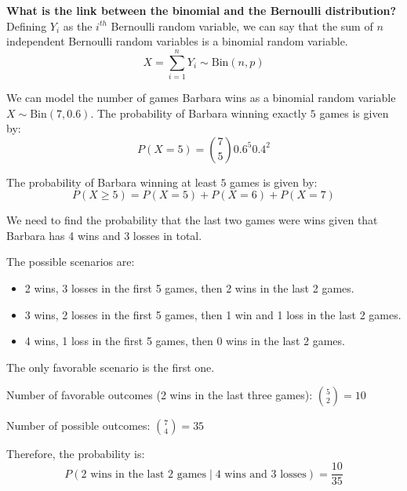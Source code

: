 \noindent\textbf{What is the link between the binomial and the Bernoulli distribution?}\\
Defining $Y_i$ as the $i^{th}$ Bernoulli random variable, we can say that the sum of $n$ independent Bernoulli random variables is a binomial random variable.
\begin{equation}
    X = \sum_{i=1}^{n} Y_i \sim \text{Bin}(n, p)
\end{equation}


We can model the number of games Barbara wins as a binomial random variable $X \sim \text{Bin}(7, 0.6)$. The probability of Barbara winning exactly $5$ games is given by:
\[
P(X=5) = \binom{7}{5} 0.6^5 0.4^2
\]


The probability of Barbara winning at least $5$ games is given by:
\[
P(X \geq 5) = P(X=5) + P(X=6) + P(X=7)
\]


We need to find the probability that the last two games were wins given that Barbara has 4 wins and 3 losses in total.

The possible scenarios are:
\begin{itemize}
    \item 2 wins, 3 losses in the first 5 games, then 2 wins in the last 2 games.
    \item 3 wins, 2 losses in the first 5 games, then 1 win and 1 loss in the last 2 games.
    \item 4 wins, 1 loss in the first 5 games, then 0 wins in the last 2 games.
\end{itemize}

The only favorable scenario is the first one.

Number of favorable outcomes (2 wins in the last three games): 
$\binom{5}{2} = 10$

Number of possible outcomes: $\binom{7}{4} = 35$

Therefore, the probability is:
\[
P(\text{2 wins in the last 2 games} \mid \text{4 wins and 3 losses}) = \frac{10}{35}
\]

